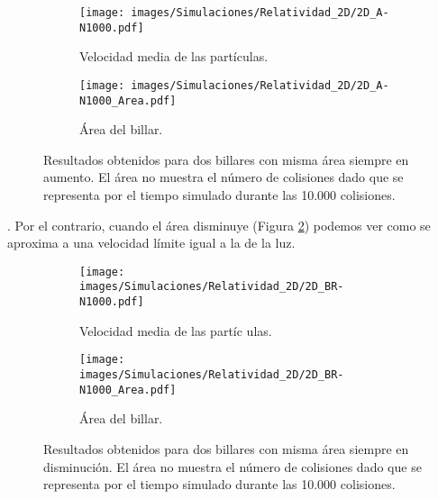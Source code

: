 \vspace{3mm}

\begin{figure}[h]
    \begin{subfigure}[b]{0.5\textwidth}
        \centering
        \texttt{[image: images/Simulaciones/Relatividad\_2D/2D\_A-N1000.pdf]}
        \caption{Velocidad media de las partículas.}
    \end{subfigure}
    \hfill
    \begin{subfigure}[b]{0.5\textwidth}
        \centering
        \texttt{[image: images/Simulaciones/Relatividad\_2D/2D\_A-N1000\_Area.pdf]}
        \caption{Área del billar.}
    \end{subfigure}
    \caption{Resultados obtenidos para dos billares con misma área siempre en aumento. El área no muestra el número de colisiones dado que se representa por el tiempo simulado durante las 10.000 colisiones.}
    \label{fig:2DR_A-N1000_con_Area}
\end{figure}

. Por el contrario, cuando el área disminuye (Figura \ref{fig:2DR_BR-N1000_con_Area}) podemos ver como se aproxima a una velocidad límite igual a la de la luz. 

\begin{figure}[!h]
    \begin{subfigure}[b]{0.5\textwidth}
        \centering
        \texttt{[image: images/Simulaciones/Relatividad\_2D/2D\_BR-N1000.pdf]}
        \caption{Velocidad media de las partíc  ulas.}
    \end{subfigure}
    \hfill
    \begin{subfigure}[b]{0.5\textwidth}
        \centering
        \texttt{[image: images/Simulaciones/Relatividad\_2D/2D\_BR-N1000\_Area.pdf]}
        \caption{Área del billar.}
    \end{subfigure}
    \caption{Resultados obtenidos para dos billares con misma área siempre en disminución. El área no muestra el número de colisiones dado que se representa por el tiempo simulado durante las 10.000 colisiones.}
    \label{fig:2DR_BR-N1000_con_Area}
\end{figure}

